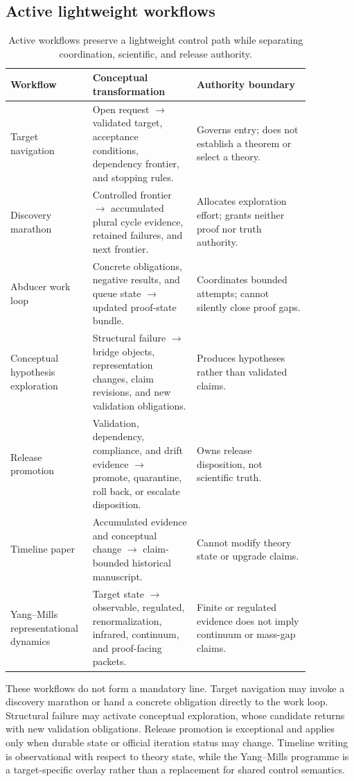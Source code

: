 \documentclass[11pt]{article}
\begin{document}
\subsection{Active lightweight workflows}

\begin{table}[H]
\centering\scriptsize
\begin{tabular}{p{0.19\linewidth}p{0.32\linewidth}p{0.35\linewidth}}
\toprule
Workflow & Conceptual transformation & Authority boundary \\
\midrule
Target navigation & Open request $\rightarrow$ validated target, acceptance conditions, dependency frontier, and stopping rules. & Governs entry; does not establish a theorem or select a theory. \\
Discovery marathon & Controlled frontier $\rightarrow$ accumulated plural cycle evidence, retained failures, and next frontier. & Allocates exploration effort; grants neither proof nor truth authority. \\
Abducer work loop & Concrete obligations, negative results, and queue state $\rightarrow$ updated proof-state bundle. & Coordinates bounded attempts; cannot silently close proof gaps. \\
Conceptual hypothesis exploration & Structural failure $\rightarrow$ bridge objects, representation changes, claim revisions, and new validation obligations. & Produces hypotheses rather than validated claims. \\
Release promotion & Validation, dependency, compliance, and drift evidence $\rightarrow$ promote, quarantine, roll back, or escalate disposition. & Owns release disposition, not scientific truth. \\
Timeline paper & Accumulated evidence and conceptual change $\rightarrow$ claim-bounded historical manuscript. & Cannot modify theory state or upgrade claims. \\
Yang--Mills representational dynamics & Target state $\rightarrow$ observable, regulated, renormalization, infrared, continuum, and proof-facing packets. & Finite or regulated evidence does not imply continuum or mass-gap claims. \\
\bottomrule
\end{tabular}
\caption{Active workflows preserve a lightweight control path while separating coordination, scientific, and release authority.}
\label{tab:active-workflows}
\end{table}

These workflows do not form a mandatory line. Target navigation may invoke a discovery marathon or hand a concrete obligation directly to the work loop. Structural failure may activate conceptual exploration, whose candidate returns with new validation obligations. Release promotion is exceptional and applies only when durable state or official iteration status may change. Timeline writing is observational with respect to theory state, while the Yang--Mills programme is a target-specific overlay rather than a replacement for shared control semantics.
\end{document}
